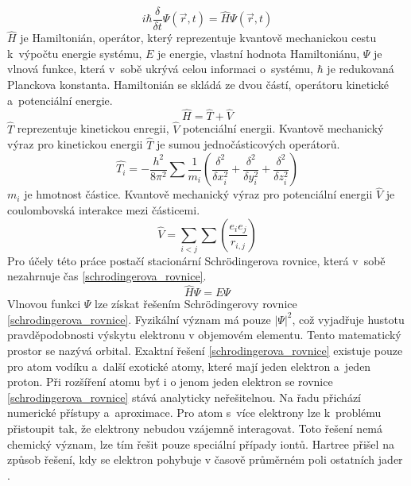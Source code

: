 \documentclass[
  printed, %
  table,   %
  lof,     %
  lot,     %
  oneside,
]{fithesis3}
\begin{document}
\begin{equation}
i \hbar \frac{\delta}{\delta t} \Psi (\vec{r},t)=\widehat{H} \Psi(\vec{r},t)
\label{SCH_time_dependent}
\end{equation}
$\widehat{H}$ je Hamiltonián, operátor, který reprezentuje kvantově mechanickou cestu k~výpočtu energie systému, $E$ je energie, vlastní hodnota Hamiltoniánu, $\Psi$ je vlnová funkce, která v~sobě ukrývá celou informaci o~systému, $\hbar$ je redukovaná Planckova konstanta. Hamiltonián se skládá ze dvou částí, operátoru kinetické a~potenciální energie.
\begin{equation}
\widehat{H} = \widehat{T} + \widehat{V}
\end{equation}
$\widehat{T}$ reprezentuje kinetickou enregii, $\widehat{V}$ potenciální energii. Kvantově mechanický výraz pro kinetickou energii $\widehat{T}$ je sumou jednočásticových operátorů. 
\begin{equation}
\widehat{T_i} = - \frac{h^2}{8 \pi ^2} \sum \frac{1}{m_i} \left( \frac{\delta^2}{\delta x_i^2} +\frac{\delta^2}{\delta y_i^2} +\frac{\delta^2}{\delta z_i^2} \right)
\end{equation}
$m_i$ je hmotnost částice. Kvantově mechanický výraz pro potenciální energii $\widehat{V}$ je coulombovská interakce mezi částicemi.
\begin{equation}
\widehat{V} = \sum_{i<j}\sum \left( \frac{e_i e_j}{r_{i,j}}\right)
\end{equation}
 Pro účely této práce postačí stacionární Schrödingerova rovnice, která v~sobě nezahrnuje čas \ref{schrodingerova_rovnice}.\\
 \begin{equation}
\widehat{H}\Psi = E \Psi
\label{schrodingerova_rovnice}
\end{equation}
Vlnovou funkci $\Psi$ lze získat řešením Schrödingerovy rovnice \ref{schrodingerova_rovnice}. Fyzikální význam má pouze $|\Psi|^2$, což vyjadřuje hustotu pravděpodobnosti výskytu elektronu v objemovém elementu. Tento matematický prostor se nazývá orbital. Exaktní řešení \ref{schrodingerova_rovnice} existuje pouze pro atom vodíku a~další exotické atomy, které mají jeden elektron a~jeden proton. Při rozšíření atomu byť i o jenom jeden elektron se rovnice \ref{schrodingerova_rovnice} stává analyticky neřešitelnou. Na řadu přichází numerické přístupy a~aproximace. Pro atom s~více elektrony lze k~problému přistoupit tak, že elektrony nebudou vzájemně interagovat. Toto řešení nemá chemický význam, lze tím řešit pouze speciální případy iontů. Hartree přišel na způsob řešení, kdy se elektron pohybuje v časově průměrném poli ostatních jader \cite{warren1986ab}.
\end{document}

